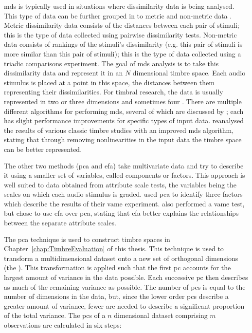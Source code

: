 		\acrshort{mds} is typically used in situations where dissimilarity data is being analysed. This type of
		data can be further grouped in to metric and non-metric data \citep{hair2013multivariate}. Metric
		dissimilarity data consists of the distances between each pair of stimuli; this is the type of data
		collected using pairwise dissimilarity tests. Non-metric data consists of rankings of the stimuli's
		dissimilarity (e.g. this pair of stimuli is more similar than this pair of stimuli); this is the type of
		data collected using a triadic comparisons experiment. The goal of \acrshort{mds} analysis is to take this
		dissimilarity data and represent it in an $N$ dimensional timbre space. Each audio stimulus is placed at a
		point in this space, the distances between them representing their dissimilarities. For timbral research,
		the data is usually represented in two \citep{giragama2003relating} or three \citep{grey1978perceptual}
		dimensions and sometimes four \citep{bernays2011verbal}. There are multiple different algorithms for
		performing \acrshort{mds}, several of which are discussed by \citet{mcadams1999perspectives}; each has
		slight performance improvements for specific types of input data. \citet{burgoyne2008a} reanalysed the
		results of various classic timbre studies with an improved \acrshort{mds} algorithm, stating that through
		removing nonlinearities in the input data the timbre space can be better represented.

		The other two methods (\acrshort{pca} and \acrshort{efa}) take multivariate data and try to describe it
		using a smaller set of variables, called components or factors. This approach is well suited to data
		obtained from attribute scale tests, the variables being the scales on which each audio stimulus is graded.
		\citet{kendall1993verbal1} used \acrshort{pca} to identify three factors which describe the results of
		their \acrshort{vame} experiment. \citet{zacharakis2012analysis} also performed a \acrshort{vame} test, but
		chose to use \acrshort{efa} over \acrshort{pca}, stating that \acrshort{efa} better explains the
		relationships between the separate attribute scales.

		The \acrshort{pca} technique is used to construct timbre spaces in Chapter~\ref{chap:TimbreEvaluation} of
		this thesis. This technique is used to transform a multidimensional dataset onto a new set of orthogonal
		dimensions (the ). This transformation is applied such that the first \acrshort{pc} accounts
		for the largest amount of variance in the data possible. Each successive \acrshort{pc} then describes as
		much of the remaining variance as possible. The number of \acrshort{pc}s is equal to the number of
		dimensions in the data, but, since the lower order \acrshort{pc}s describe a greater amount of variance,
		fewer are needed to describe a significant proportion of the total variance. The \acrshort{pc}s
		of a $n$ dimensional dataset comprising $m$ observations are calculated in six steps:

